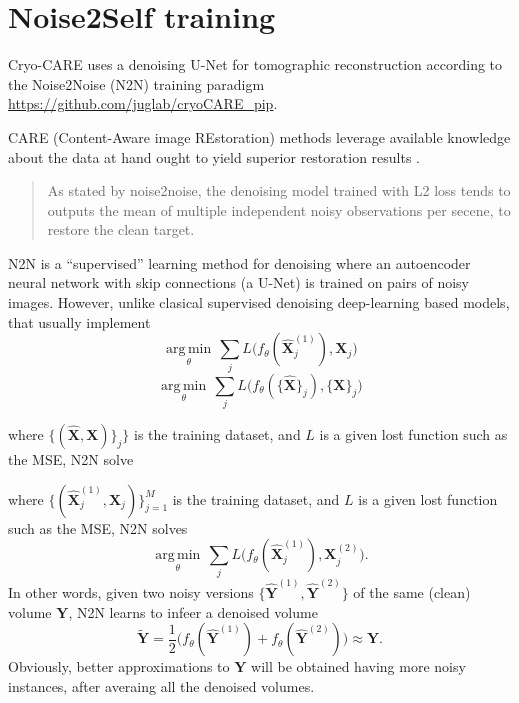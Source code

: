 \section{Noise2Self training}


Cryo-CARE \cite{buchholz2019cryo} uses a denoising U-Net for
tomographic reconstruction according to the Noise2Noise (N2N)
\cite{lehtinen2018noise2noise} training paradigm
\url{https://github.com/juglab/cryoCARE_pip}.

CARE (Content-Aware image REstoration) methods leverage available
knowledge about the data at hand ought to yield superior restoration
results \cite{weigert2018content}.

\begin{quote}
  As stated by noise2noise, the denoising model trained with L2 loss tends to outputs the mean of multiple independent noisy observations per secene, to restore the clean target.
\end{quote}

N2N is a ``supervised'' learning method for denoising where an
autoencoder neural network with skip connections (a U-Net) is trained
on pairs of noisy images. However, unlike clasical supervised
denoising deep-learning based models, that usually implement
\cite{lehtinen2018noise2noise}
\begin{equation}
  \underset{\theta}{\operatorname{arg\,min}} \, \sum_j L \big(f_\theta(\hat{\mathbf X}_j^{(1)}), {\mathbf X}_j\big)
\end{equation}
\begin{equation}
  \underset{\theta}{\operatorname{arg\,min}} \, \sum_j L \big(f_\theta(\{\hat{\mathbf X}\}_j), \{{\mathbf X}\}_j\big)
\end{equation}

where $\{(\hat{\mathbf{X}}, \mathbf{X})\}_j\}$ is the training
dataset, and $L$ is a given lost function such as the MSE, N2N solve

where $\{(\hat{\mathbf X}_j^{(1)}, {\mathbf X}_j)\}_{j=1}^M$ is the training
dataset, and $L$ is a given lost function such as the MSE, N2N solves
\begin{equation}
  \underset{\theta}{\operatorname{arg\,min}} \, \sum_j L \big(f_\theta(\hat{\mathbf X}_j^{(1)}), {\mathbf X}_j^{(2)}\big).
\end{equation}
In other words, given two noisy versions
$\{\hat{\mathbf Y}^{(1)}, \hat{\mathbf Y}^{(2)}\}$ of the same (clean)
volume ${\mathbf Y}$, N2N learns to infeer a denoised volume
\begin{equation}
  \tilde{\mathbf Y}=\frac{1}{2}\big(f_\theta(\hat{\mathbf Y}^{(1)})+f_\theta(\hat{\mathbf Y}^{(2)})\big)\approx{\mathbf Y}.
\end{equation}
Obviously, better approximations to ${\mathbf Y}$ will be obtained
having more noisy instances, after averaing all the denoised volumes.

